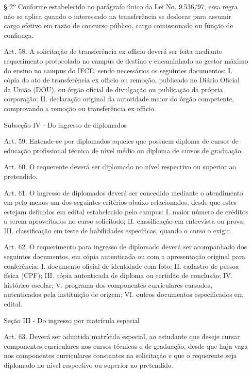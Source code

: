 \documentclass{paper}
\begin{document}
§ 2º Conforme estabelecido no parágrafo único da Lei No. 9.536/97, essa regra não se aplica quando o interessado na transferência se deslocar para assumir cargo efetivo em razão de concurso público, cargo comissionado ou função de confiança.

Art. 58. A solicitação de transferência ex officio deverá ser feita mediante requerimento protocolado no campus de destino e encaminhado ao gestor máximo do ensino no campus do IFCE, sendo necessários os seguintes documentos:
I. cópia do ato de transferência ex officio ou remoção, publicado no Diário Oficial da União (DOU), ou órgão oficial de divulgação ou publicação da própria corporação;
II. declaração original da autoridade maior do órgão competente, comprovando a remoção ou transferência ex officio.

\begin{center}
Subseção IV - Do ingresso de diplomados
\end{center}

Art. 59. Entende-se por diplomados aqueles que possuem diploma de cursos de educação profissional técnica de nível médio ou diploma de cursos de graduação.

Art. 60. O requerente deverá ser diplomado no nível respectivo ou superior ao pretendido.

Art. 61. O ingresso de diplomados deverá ser concedido mediante o atendimento em pelo menos um dos seguintes critérios abaixo relacionados, desde que estes estejam definidos em edital estabelecido pelo campus:
I. maior número de créditos a serem aproveitados no curso solicitado;
II. classificação em entrevista ou prova;
III. classificação em teste de habilidades específicas, quando o curso o exigir.
    
Art. 62. O requerimento para ingresso de diplomado deverá ser acompanhado dos seguintes documentos, em cópia autenticada ou com a apresentação original para conferência:
I. documento oficial de identidade com foto;
II. cadastro de pessoa física (CPF);
III. cópia autenticada de diploma ou certidão de conclusão;
IV. histórico escolar;
V. programa dos componentes curriculares cursados, autenticados pela instituição de origem;
VI. outros documentos especificados em edital.

\begin{center}
Seção III - Do ingresso por matrícula especial
\end{center}

Art. 63. Deverá ser admitida matrícula especial, ao estudante que deseje cursar componentes curriculares nos cursos técnicos e de graduação, desde que haja vaga nos componentes curriculares constantes na solicitação e que o requerente seja diplomado no nível respectivo ou superior ao pretendido.
\end{document}
